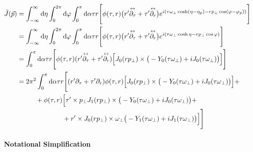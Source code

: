 \begin{subequations}
    \begin{align}
        \tilde{J}(\vec{p}) & =\int_{-\infty}^\infty\text{d}\eta\int_0^{2\pi}\text{d}\varphi\int_0^\pi\text{d}\alpha\tau r\Bigg[\phi(\tau,r)\big(r^\prime\overset{\leftrightarrow}{\partial_\tau}+\tau^\prime\overset{\leftrightarrow}{\partial_r}\big)e^{{i}(\tau \omega_\perp\cosh(\eta-\eta_p)-r p_\perp\cos(\varphi-\varphi_p))}\Bigg] \\
                           & =\int_{-\infty}^\infty\text{d}\eta\int_0^{2\pi}\text{d}\varphi\int_0^\pi\text{d}\alpha\tau r\Bigg[\phi(\tau,r)\big(r^\prime\overset{\leftrightarrow}{\partial_\tau}+\tau^\prime\overset{\leftrightarrow}{\partial_r}\big)e^{{i}(\tau \omega_\perp\cosh\eta-r p_\perp\cos\varphi)}\Bigg]                      \\
                           & =\int_0^\pi\text{d}\alpha\tau r\Bigg[\phi(\tau,r)(r^\prime\overset{\leftrightarrow}{\partial_\tau}+\tau^\prime\overset{\leftrightarrow}{\partial_r})\Big[J_0(r p_\perp)\times\big(-Y_0(\tau\omega_\perp)+{i} J_0(\tau\omega_\perp)\big)\Big]\Bigg]                                                 \\
                           & =2\pi^2\int_0^\pi\text{d}\alpha\tau r\Bigg[(r^\prime\partial_\tau+\tau^\prime\partial_r)\phi(\tau,r)\Big[J_0(r p_\perp)\times\big(-Y_0(\tau\omega_\perp)+{i} J_0(\tau\omega_\perp)\big)\Big]+\nonumber                                                                                             \\
                           & \phantom{=}\qquad + \phi(\tau,r)\Big[\tau^\prime\times p_\perp J_1(r p_\perp)\times\big(-Y_0(\tau\omega_\perp)+{i} J_0(\tau\omega_\perp)\big)+\nonumber                                                                                                                                       \\
                           & \phantom{=}\qquad\phantom{+\phi(\tau,r)\Big[}+r^\prime\times J_0(r p_\perp)\times\omega_\perp\big(-Y_1(\tau\omega_\perp)+{i} J_1(\tau\omega_\perp)\big)\Big]\Bigg]
    \end{align}
\end{subequations}

\paragraph*{Notational Simplification}\mbox{}\\

